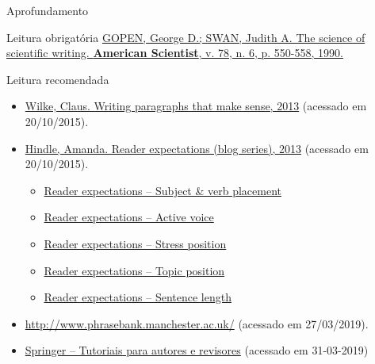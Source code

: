 \documentclass{beamer}
\begin{document}
\begin{frame}{Aprofundamento}
  \begin{block}{Leitura obrigatória}
    \footnotesize
    \href{https://www.georgegopen.com/uploads/1/0/9/0/109073507/gopen___swan_sci_of_sci_writing_am_sci_1990_.pdf}
    {GOPEN, George D.; SWAN, Judith A. The science of scientific writing. {\bf American Scientist}, v. 78, n. 6, p. 550-558, 1990.}
  \end{block}
  \begin{block}{Leitura recomendada}
    \begin{itemize}
      \tiny
    \item
      \href{http://serialmentor.com/blog/2013/9/26/writing-paragraphs-that-make-sensethe-topic-and-the-stress-position}
      {Wilke, Claus. Writing paragraphs that make sense, 2013} {\tiny (acessado em 20/10/2015)}.
    \item
      \href{https://web.archive.org/web/20150512085221/http://www.edanzediting.com/blog/tag/reader_expectations}
      {Hindle, Amanda. Reader expectations (blog series), 2013} {\tiny (acessado em 20/10/2015)}.
      \begin{itemize}
        \tiny
      \item
        \href{https://web.archive.org/web/20150512001938/http://www.edanzediting.com/blog/reader_expectations_subject_verb_placement}
        {Reader expectations -- Subject \& verb placement}
      \item
        \href{https://web.archive.org/web/20150321052033/http://www.edanzediting.com/blog/reader_expectations_active_voice}
        {Reader expectations -- Active voice}
      \item
        \href{https://web.archive.org/web/20150511225632/http://www.edanzediting.com/blog/reader_expectations_stress_position}
        {Reader expectations -- Stress position}
      \item
        \href{https://web.archive.org/web/20150512123007/http://www.edanzediting.com/blog/reader_expectations_topic_position}
        {Reader expectations -- Topic position}
      \item
        \href{https://web.archive.org/web/20150512003347/http://www.edanzediting.com/blog/reader_expectations_sentence_length}
        {Reader expectations -- Sentence length}
      \end{itemize}
    \item
      \url{http://www.phrasebank.manchester.ac.uk/} {\tiny (acessado em 27/03/2019)}.
    \item
      \href{https://www.springer.com/br/authors-editors/authorandreviewertutorials/writinginenglish/avoiding-common-language-issues/12012044}
      {Springer -- Tutoriais para autores e revisores} {\tiny(acessado em 31-03-2019)}
    \end{itemize}
  \end{block}
\end{frame}
\end{document}
